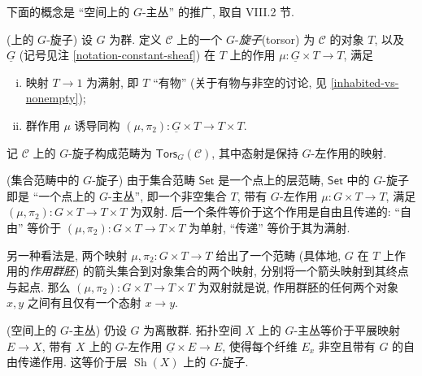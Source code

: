 下面的概念是 ``空间上的 $G$-主丛'' 的推广, 取自 \cite{SGL} VIII.2 节.
\begin{definition}
	[label={G-torsors-over-topos}]
	{(\topos{}上的 $G$-旋子)}
	设 $G$ 为群. 定义 $\mathcal C$ 上的一个 $G$-\emph{旋子}\footnotemark (torsor) 为 $\mathcal C$ 的对象 $T$, 以及 $\underline G$ (记号见注 \ref{notation-constant-sheaf}) 在 $T$ 上的作用 $\mu\colon \underline G\times T \to T$, 满足
	\begin{enumerate}[(i)]
		\item 映射 $T\to 1$ 为满射, 即 $T$ ``有物'' (关于有物与非空的讨论, 见 \ref{inhabited-vs-nonempty});
		\item 群作用 $\mu$ 诱导同构 $(\mu,\pi_2)\colon \underline G\times T \to T\times T$.
	\end{enumerate}
	记 $\mathcal C$ 上的 $G$-旋子构成范畴为 $\mathsf{Tors}_G(\mathcal C)$, 其中态射是保持 $G$-左作用的映射.
\end{definition}

%	

\begin{example}
	{(集合范畴中的 $G$-旋子)}
	由于集合范畴 $\mathsf {Set}$ 是一个点上的层范畴,
	$\mathsf {Set}$ 中的 $G$-旋子即是 ``一个点上的 $G$-主丛'',
	即一个非空集合 $T$, 带有 $G$-左作用 $\mu\colon G\times T \to T$, 满足 $(\mu,\pi_2)\colon G\times T \to T\times T$ 为双射.
	后一个条件等价于这个作用是自由且传递的:
	``自由'' 等价于 $(\mu,\pi_2)\colon G\times T \to T\times T$ 为单射, ``传递'' 等价于其为满射.
	
	另一种看法是, 两个映射 $\mu,\pi_2\colon G\times T \to T$ 给出了一个范畴 (具体地, $G$ 在 $T$ 上作用的\emph{作用群胚}) 的箭头集合到对象集合的两个映射, 分别将一个箭头映射到其终点与起点. 那么 $(\mu,\pi_2)\colon G\times T \to T\times T$ 为双射就是说, 作用群胚的任何两个对象 $x,y$ 之间有且仅有一个态射 $x\to y$.
\end{example}

\begin{example}
	{(空间上的 $G$-主丛)}
	仍设 $G$ 为离散群. 拓扑空间 $X$ 上的 $G$-主丛等价于平展映射 $E \to X$, 带有 $X$ 上的 $G$-左作用 $\underline G\times E \to E$, 使得每个纤维 $E_x$ 非空且带有 $G$ 的自由传递作用. 这等价于层\topos{} $\operatorname{Sh}(X)$ 上的 $G$-旋子.
\end{example}

